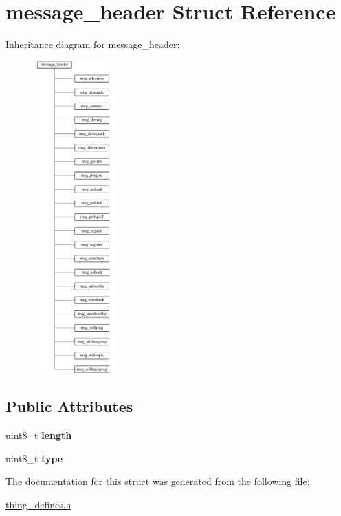 \hypertarget{structmessage__header}{\section{message\-\_\-header Struct Reference}
\label{structmessage__header}
}
Inheritance diagram for message\-\_\-header\-:\begin{figure}[H]
\begin{center}
\leavevmode
\includegraphics[height=12.000000cm]{structmessage__header}
\end{center}
\end{figure}
\subsection*{Public Attributes}
\begin{DoxyCompactItemize}
\item 
\hypertarget{structmessage__header_a8b6faf1d2a226e583d76d197cde1fff0}{uint8\-\_\-t {\bfseries length}}\label{structmessage__header_a8b6faf1d2a226e583d76d197cde1fff0}

\item 
\hypertarget{structmessage__header_ac23a31e93b17daaff54136321916b583}{uint8\-\_\-t {\bfseries type}}\label{structmessage__header_ac23a31e93b17daaff54136321916b583}

\end{DoxyCompactItemize}


The documentation for this struct was generated from the following file\-:\begin{DoxyCompactItemize}
\item 
\hyperlink{thing__defines_8h}{thing\-\_\-defines.\-h}\end{DoxyCompactItemize}
